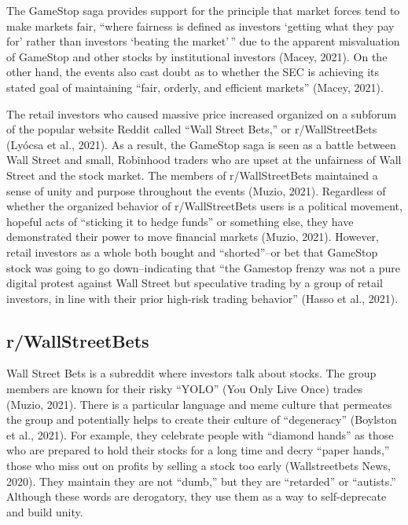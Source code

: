 \documentclass[12pt,]{article}
\begin{document}
The GameStop saga provides support for the principle that market forces
tend to make markets fair, ``where fairness is defined as investors
`getting what they pay for' rather than investors `beating the
market'\,'' due to the apparent misvaluation of GameStop and other
stocks by institutional investors (Macey, 2021). On the other hand, the
events also cast doubt as to whether the SEC is achieving its stated
goal of maintaining ``fair, orderly, and efficient markets'' (Macey,
2021).

The retail investors who caused massive price increased organized on a
subforum of the popular website Reddit called ``Wall Street Bets,'' or
r/WallStreetBets (Lyócsa et al., 2021). As a result, the GameStop saga
is seen as a battle between Wall Street and small, Robinhood traders who
are upset at the unfairness of Wall Street and the stock market. The
members of r/WallStreetBets maintained a sense of unity and purpose
throughout the events (Muzio, 2021). Regardless of whether the organized
behavior of r/WallStreetBets users is a political movement, hopeful acts
of ``sticking it to hedge funds'' or something else, they have
demonstrated their power to move financial markets (Muzio, 2021).
However, retail investors as a whole both bought and ``shorted''--or bet
that GameStop stock was going to go down--indicating that ``the Gamestop
frenzy was not a pure digital protest against Wall Street but
speculative trading by a group of retail investors, in line with their
prior high-risk trading behavior'' (Hasso et al., 2021).

\hypertarget{rwallstreetbets}{%
\subsection{r/WallStreetBets}\label{rwallstreetbets}}

Wall Street Bets is a subreddit where investors talk about stocks. The
group members are known for their risky ``YOLO'' (You Only Live Once)
trades (Muzio, 2021). There is a particular language and meme culture
that permeates the group and potentially helps to create their culture
of ``degeneracy'' (Boylston et al., 2021). For example, they celebrate
people with ``diamond hands'' as those who are prepared to hold their
stocks for a long time and decry ``paper hands,'' those who miss out on
profits by selling a stock too early (Wallstreetbets News, 2020). They
maintain they are not ``dumb,'' but they are ``retarded'' or
``autists.'' Although these words are derogatory, they use them as a way
to self-deprecate and build unity.
\end{document}
